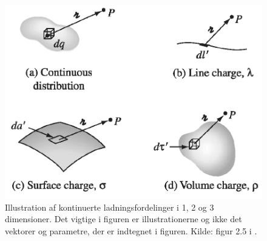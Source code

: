 %
\begin{figure}
    \centering
    \includegraphics[width=.6\columnwidth]{Elektro/Figurer/ladningsfordeling.PNG}
    \caption{Illustration af kontinuerte ladningsfordelinger i 1, 2 og 3 dimensioner. Det vigtige i figuren er illustrationerne og ikke det vektorer og parametre, der er indtegnet i figuren. Kilde: figur 2.5 i \cite{griffithsIntroductionElectrodynamics2017}.}
    \label{fig:ladningsfordeling}
\end{figure}
%

